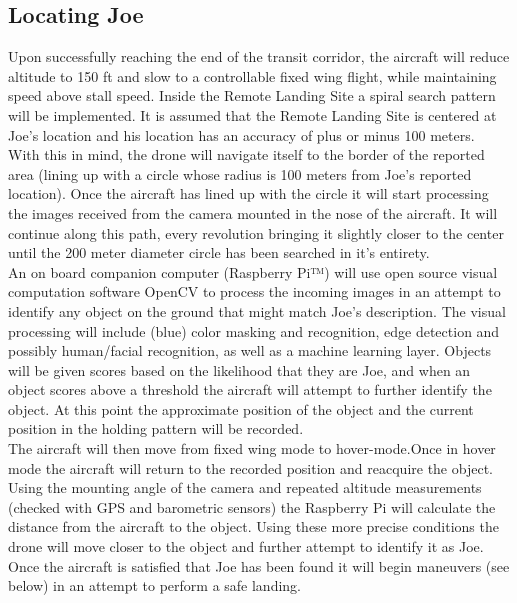 \subsection{Locating Joe}
Upon successfully reaching the end of the transit corridor, the aircraft will reduce altitude to 150 ft and slow to a controllable fixed wing flight, while maintaining speed above stall speed. Inside the Remote Landing Site a spiral search pattern will be implemented. It is assumed that the Remote Landing Site is centered at Joe’s location and his location has an accuracy of plus or minus 100 meters.\\

With this in mind, the drone will navigate itself to the border of the reported area (lining up with a circle whose radius is 100 meters from Joe’s reported location). Once the aircraft has lined up with the circle it will start processing the images received from the camera mounted in the nose of the aircraft. It will continue along this path, every revolution bringing it slightly closer to the center until the 200 meter diameter circle has been searched in it’s entirety.\\

An on board companion computer (Raspberry Pi™) will use open source visual computation software OpenCV to process the incoming images in an attempt to identify any object on the ground that might match Joe’s description. The visual processing will include (blue) color masking and recognition, edge detection and possibly human/facial recognition, as well as a machine learning layer. Objects will be given scores based on the likelihood that they are Joe, and when an object scores above a threshold the aircraft will attempt to further identify the object. At this point the approximate position of the object and the current position in the holding pattern will be recorded.\\

The aircraft will then move from fixed wing mode to hover-mode.Once in hover mode the aircraft will return to the recorded position and reacquire the object. Using the mounting angle of the camera and repeated altitude measurements (checked with GPS and barometric sensors) the Raspberry Pi will calculate the distance from the aircraft to the object. Using these more precise conditions the drone will move closer to the object and further attempt to identify it as Joe. Once the aircraft is satisfied that Joe has been found it will begin maneuvers (see below) in an attempt to perform a safe landing.\\

